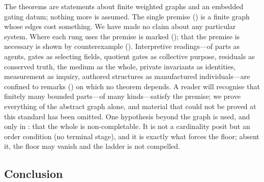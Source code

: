 \documentclass[11pt,a4paper]{article}
\theoremstyle{thmstyle}
\theoremstyle{definition}
\theoremstyle{remark}
\begin{document}
The theorems are statements about finite weighted graphs and an embedded gating
datum; nothing more is assumed. The single premise () is a finite
graph whose edges cost something. We have made no claim about any particular
system. Where each rung uses the premise is marked (); that
the premise is necessary is shown by counterexample ().
Interpretive readings---of parts as agents, gates as selecting fields, quotient
gates as collective purpose, residuals as conserved truth, the medium as the
whole, private invariants as identities, measurement as inquiry, authored
structures as manufactured individuals---are confined to remarks
() on which no theorem depends. A reader
will recognise that finitely many bounded parts---of many kinds---satisfy the
premise; we prove everything of the abstract graph alone, and material that could
not be proved at this standard has been omitted. One hypothesis beyond the graph
is used, and only in : that the whole is non-completable. It is
not a cardinality posit but an order condition (no terminal stage), and it is
exactly what forces the floor; absent it, the floor may vanish and the ladder is
not compelled.

\subsection{Conclusion}
\end{document}
